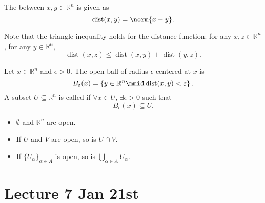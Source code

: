 \documentclass[notoc,notitlepage]{tufte-book}
\DeclareMathOperator{\dist}{dist}
\begin{document}
\begin{defn}[Distance]\label{defn:distance}
  The  between $x, y \in \mathbb{R}^n$ is given as
  \begin{equation*}
    \dist(x, y) = \norm{x - y}.
  \end{equation*}
\end{defn}

\begin{note}
  Note that the triangle inequality holds for the distance function: for any
  $x, z \in \mathbb{R}^n$, for any $y \in \mathbb{R}^n$,
  \begin{equation*}
    \dist(x, z) \leq \dist(x, y) + \dist(y, z).
  \end{equation*}
\end{note}

\begin{defn}\label{defn:open_ball}
  Let $x \in \mathbb{R}^n$ and $\epsilon > 0$. The open ball of radius $\epsilon$ centered
  at $x$ is
  \begin{equation*}
    B_{\epsilon}(x) = \left\{ y \in \mathbb{R}^n \mmid \dist(x, y) < \epsilon \right\}.
  \end{equation*}
  A subset $U \subseteq \mathbb{R}^n$ is called  if $\forall x \in U$,
  $\exists \epsilon > 0$ such that
  \begin{equation*}
    B_{\epsilon}(x) \subseteq U.
  \end{equation*}
\end{defn}

\begin{eg}
  \begin{itemize}
    \item $\emptyset$ and $\mathbb{R}^n$ are open.
    \item If $U$ and $V$ are open, so is $U \cap V$.
    \item If $\{ U_\alpha \}_{\alpha \in A}$ is open, so is $\bigcup_{\alpha \in A} U_\alpha$.
  \end{itemize}
\end{eg}



\chapter{Lecture 7 Jan 21st}%
\label{chp:lecture_7_jan_21st}
\end{document}
